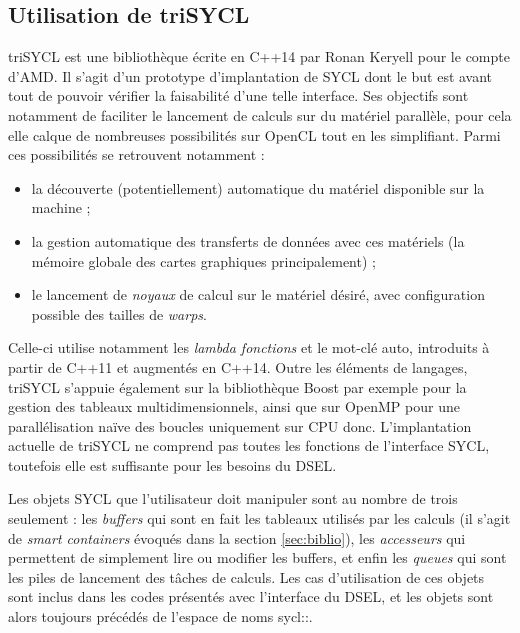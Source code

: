 \subsection{Utilisation de \textsf{triSYCL}}

\textsf{triSYCL} est une bibliothèque écrite en \textsf{C++14} par Ronan Keryell pour le compte d'\textsf{AMD}. Il s'agit d'un prototype d'implantation de \textsf{SYCL} dont le but est avant tout de pouvoir vérifier la faisabilité d'une telle interface. Ses objectifs sont notamment de faciliter le lancement de calculs sur du matériel parallèle, pour cela elle calque de nombreuses possibilités sur \textsf{OpenCL} tout en les simplifiant. Parmi ces possibilités se retrouvent notamment :
\begin{itemize} 
\item la découverte (potentiellement) automatique du matériel disponible sur la machine ;
\item la gestion automatique des transferts de données avec ces matériels (la mémoire globale des cartes graphiques principalement) ;
\item le lancement de \emph{noyaux} de calcul sur le matériel désiré, avec configuration possible des tailles de \emph{warps}.
\end{itemize}

Celle-ci utilise notamment les \emph{lambda fonctions} et le mot-clé \textsf{auto}, introduits à partir de \textsf{C++11} et augmentés en \textsf{C++14}. Outre les éléments de langages, \textsf{triSYCL} s'appuie également sur la bibliothèque \textsf{Boost} par exemple pour la gestion des tableaux multidimensionnels, ainsi que sur \textsf{OpenMP} pour une parallélisation naïve des boucles uniquement sur CPU donc. L'implantation actuelle de \textsf{triSYCL} ne comprend pas toutes les fonctions de l'interface \textsf{SYCL}, toutefois elle est suffisante pour les besoins du DSEL.

Les objets \textsf{SYCL} que l'utilisateur doit manipuler sont au nombre de trois seulement : les \emph{buffers} qui sont en fait les tableaux utilisés par les calculs (il s'agit de \emph{smart containers} évoqués dans la section \ref{sec:biblio}), les \emph{accesseurs} qui permettent de simplement lire ou modifier les buffers, et enfin les \emph{queues} qui sont les piles de lancement des tâches de calculs. Les cas d'utilisation de ces objets sont inclus dans les codes présentés avec l'interface du DSEL, et les objets sont alors toujours précédés de l'espace de noms \textsf{sycl::}.

